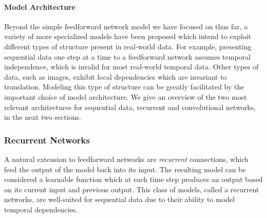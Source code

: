 \paragraph{Model Architecture}

Beyond the simple feedforward network model we have focused on thus far, a variety of more specialized models have been proposed which intend to exploit different types of structure present in real-world data.
For example, presenting sequential data one step at a time to a feedforward network assumes temporal independence, which is invalid for most real-world temporal data.
Other types of data, such as images, exhibit local dependencies which are invariant to translation.
Modeling this type of structure can be greatly facilitated by the important choice of model architecture.
We give an overview of the two most relevant architectures for sequential data, recurrent and convolutional networks, in the next two sections.

\subsubsection{Recurrent Networks}

A natural extension to feedforward networks are {\em recurrent} connections, which feed the output of the model back into its input.
The resulting model can be considered a learnable function which at each time step produces an output based on its current input and previous output.
This class of models, called a recurrent networks, are well-suited for sequential data due to their ability to model temporal dependencies.

